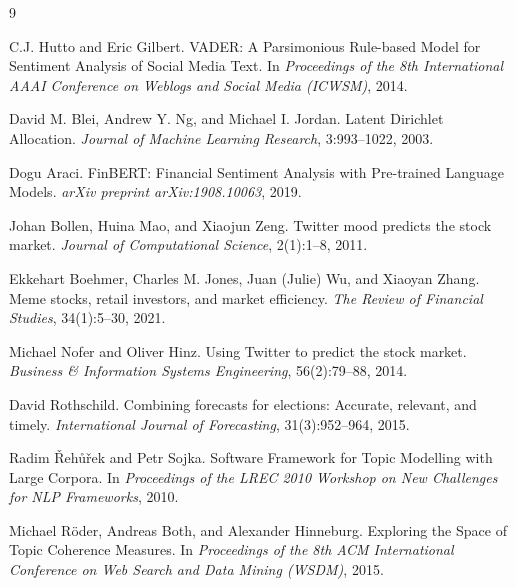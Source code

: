 \documentclass[sigconf]{acmart}
\begin{document}

\begin{thebibliography}{9}

C.J. Hutto and Eric Gilbert.
\newblock VADER: A Parsimonious Rule-based Model for Sentiment Analysis of Social Media Text.
\newblock In \textit{Proceedings of the 8th International AAAI Conference on Weblogs and Social Media (ICWSM)}, 2014.

David M. Blei, Andrew Y. Ng, and Michael I. Jordan.
\newblock Latent Dirichlet Allocation.
\newblock \textit{Journal of Machine Learning Research}, 3:993--1022, 2003.

Dogu Araci.
\newblock FinBERT: Financial Sentiment Analysis with Pre-trained Language Models.
\newblock \textit{arXiv preprint arXiv:1908.10063}, 2019.

Johan Bollen, Huina Mao, and Xiaojun Zeng.
\newblock Twitter mood predicts the stock market.
\newblock \textit{Journal of Computational Science}, 2(1):1--8, 2011.

Ekkehart Boehmer, Charles M. Jones, Juan (Julie) Wu, and Xiaoyan Zhang.
\newblock Meme stocks, retail investors, and market efficiency.
\newblock \textit{The Review of Financial Studies}, 34(1):5--30, 2021.

Michael Nofer and Oliver Hinz.
\newblock Using Twitter to predict the stock market.
\newblock \textit{Business \& Information Systems Engineering}, 56(2):79--88, 2014.

David Rothschild.
\newblock Combining forecasts for elections: Accurate, relevant, and timely.
\newblock \textit{International Journal of Forecasting}, 31(3):952--964, 2015.

Radim \v{R}eh\r{u}\v{r}ek and Petr Sojka.
\newblock Software Framework for Topic Modelling with Large Corpora.
\newblock In \textit{Proceedings of the LREC 2010 Workshop on New Challenges for NLP Frameworks}, 2010.

Michael R\"{o}der, Andreas Both, and Alexander Hinneburg.
\newblock Exploring the Space of Topic Coherence Measures.
\newblock In \textit{Proceedings of the 8th ACM International Conference on Web Search and Data Mining (WSDM)}, 2015.

\end{thebibliography}
\end{document}
